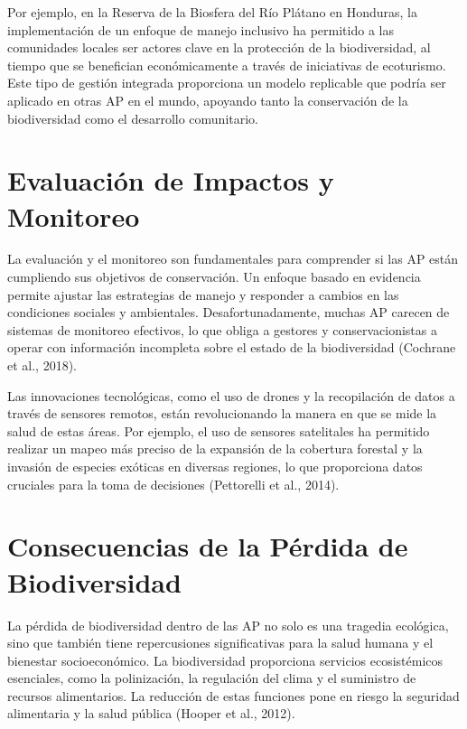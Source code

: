 \documentclass[
  letterpaper,
  DIV=11,
  numbers=noendperiod,
  oneside]{scrreprt}
\begin{document}
Por ejemplo, en la Reserva de la Biosfera del Río Plátano en Honduras,
la implementación de un enfoque de manejo inclusivo ha permitido a las
comunidades locales ser actores clave en la protección de la
biodiversidad, al tiempo que se benefician económicamente a través de
iniciativas de ecoturismo. Este tipo de gestión integrada proporciona un
modelo replicable que podría ser aplicado en otras AP en el mundo,
apoyando tanto la conservación de la biodiversidad como el desarrollo
comunitario.

\section{Evaluación de Impactos y
Monitoreo}\label{evaluaciuxf3n-de-impactos-y-monitoreo}

La evaluación y el monitoreo son fundamentales para comprender si las AP
están cumpliendo sus objetivos de conservación. Un enfoque basado en
evidencia permite ajustar las estrategias de manejo y responder a
cambios en las condiciones sociales y ambientales. Desafortunadamente,
muchas AP carecen de sistemas de monitoreo efectivos, lo que obliga a
gestores y conservacionistas a operar con información incompleta sobre
el estado de la biodiversidad (Cochrane et al., 2018).

Las innovaciones tecnológicas, como el uso de drones y la recopilación
de datos a través de sensores remotos, están revolucionando la manera en
que se mide la salud de estas áreas. Por ejemplo, el uso de sensores
satelitales ha permitido realizar un mapeo más preciso de la expansión
de la cobertura forestal y la invasión de especies exóticas en diversas
regiones, lo que proporciona datos cruciales para la toma de decisiones
(Pettorelli et al., 2014).

\section{Consecuencias de la Pérdida de
Biodiversidad}\label{consecuencias-de-la-puxe9rdida-de-biodiversidad}

La pérdida de biodiversidad dentro de las AP no solo es una tragedia
ecológica, sino que también tiene repercusiones significativas para la
salud humana y el bienestar socioeconómico. La biodiversidad proporciona
servicios ecosistémicos esenciales, como la polinización, la regulación
del clima y el suministro de recursos alimentarios. La reducción de
estas funciones pone en riesgo la seguridad alimentaria y la salud
pública (Hooper et al., 2012).
\end{document}
